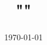 \documentclass[10pt]{article}
\title{ \\ "{\em }" }
\author{}
\date{\today}
\begin{document}
     \def\appendixpage{\newpage \begin{center}  \Huge\textbf{Annexe}  \end{center}  }
     \def\appendixname{Annexe}%
     \maketitle
\end{document}
